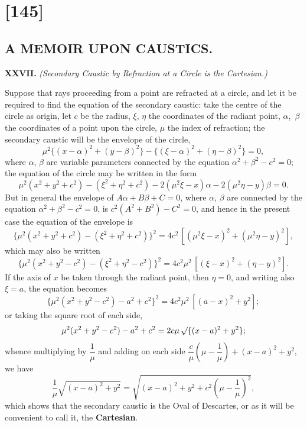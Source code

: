 \documentclass[12pt,a4paper]{article}
\theoremstyle{definition}
\begin{document}
\section*{[145]}
\subsection*{A MEMOIR UPON CAUSTICS.}

\medskip\noindent\textbf{XXVII.}
\textit{(Secondary Caustic by Refraction at a Circle is the Cartesian.)}

Suppose that rays proceeding from a point are refracted at a circle,
and let it be required to find the equation of the secondary caustic:
take the centre of the circle as origin, let $c$ be the radius,
$\xi$, $\eta$ the coordinates of the radiant point, $\alpha$,~$\beta$
the coordinates of a point upon the circle, $\mu$ the index of refraction;
the secondary caustic will be the envelope of the circle,
\[
\mu^{2} \{(x - \alpha)^{2} + (y - \beta)^{2}\}
- \{(\xi - \alpha)^{2} + (\eta - \beta)^{2}\} = 0,
\]
where $\alpha$, $\beta$ are variable parameters connected by the equation
$\alpha^{2} + \beta^{2} - c^{2} = 0$;
the equation of the circle may be written in the form
\[
\mu^{2} (x^{2} + y^{2} + c^{2}) - (\xi^{2} + \eta^{2} + c^{2})
- 2(\mu^{2}\xi - x)\alpha - 2(\mu^{2}\eta - y)\beta = 0.
\]
But in general the envelope of $A\alpha + B\beta + C = 0$,
where $\alpha$, $\beta$ are connected by the equation
$\alpha^{2} + \beta^{2} - c^{2} = 0$, is
$c^{2}(A^{2} + B^{2}) - C^{2} = 0$, and hence in the present case
the equation of the envelope is
\[
\{ \mu^{2} (x^{2} + y^{2} + c^{2}) - (\xi^{2} + \eta^{2} + c^{2}) \}^{2}
= 4c^{2} \, [ (\mu^{2}\xi - x)^{2} + (\mu^{2}\eta - y)^{2} ],
\]
which may also be written
\[
\{ \mu^{2} (x^{2} + y^{2} - c^{2}) - (\xi^{2} + \eta^{2} - c^{2}) \}^{2}
= 4c^{2}\mu^{2} \, [ (\xi - x)^{2} + (\eta - y)^{2} ].
\]
If the axis of $x$ be taken through the radiant point,
then $\eta = 0$, and writing also $\xi = a$, the equation becomes
\[
\{ \mu^{2} (x^{2} + y^{2} - c^{2}) - a^{2} + c^{2} \}^{2}
= 4c^{2}\mu^{2} \, [ (a - x)^{2} + y^{2} ];
\]
or taking the square root of each side,
\[
\mu^{2} (x^{2} + y^{2} - c^{2}) - a^{2} + c^{2}
= 2c\mu \, \surd\{ (x - a)^{2} + y^{2} \};
\]
whence multiplying by $\dfrac{1}{\mu}$ and adding on each side
$\dfrac{c}{\mu} \left( \mu - \dfrac{1}{\mu} \right) + (x - a)^{2} + y^{2}$, we have
\[
\frac{1}{\mu} \sqrt{(x - a)^{2} + y^{2}}
= \sqrt{(x - a)^{2} + y^{2} + c^{2} \left( \mu - \frac{1}{\mu} \right)^{2}},
\]
which shows that the secondary caustic is the Oval of Descartes,
or as it will be convenient to call it, the \textbf{Cartesian}.
\end{document}
